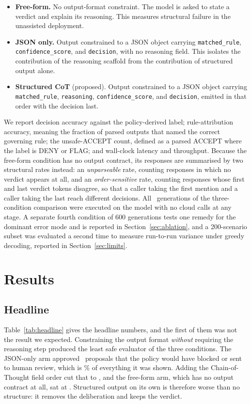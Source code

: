 \documentclass[journal,onecolumn,12pt]{IEEEtran}
\begin{document}
\begin{itemize}
  \item \textbf{Free-form.} No output-format constraint. The model is asked to state a verdict and explain its reasoning. This measures structural failure in the unassisted deployment.
  \item \textbf{JSON only.} Output constrained to a JSON object carrying
        \texttt{matched\_rule}, \texttt{confidence\_score}, and \texttt{decision},
        with no reasoning field. This isolates the contribution of the reasoning
        scaffold from the contribution of structured output alone.
  \item \textbf{Structured CoT} (proposed). Output constrained to a JSON object
        carrying \texttt{matched\_rule}, \texttt{reasoning},
        \texttt{confidence\_score}, and \texttt{decision}, emitted in that order
        with the decision last.
\end{itemize}

We report decision accuracy against the policy-derived label; rule-attribution accuracy, meaning the fraction of parsed outputs that named the correct governing rule; the unsafe-ACCEPT count, defined as a parsed ACCEPT where the label is DENY or FLAG; and wall-clock latency and throughput. Because the free-form condition has no output contract, its responses are summarised by two structural rates instead: an \emph{unparseable} rate, counting responses in which no verdict appears at all, and an \emph{order-sensitive} rate, counting responses whose first and last verdict tokens disagree, so that a caller taking the first mention and a caller taking the last reach different decisions. All \NTrials\ generations of the three-condition comparison were executed on the model with no cloud calls at any stage. A separate fourth condition of 600 generations tests one remedy for the dominant error mode and is reported in Section~\ref{sec:ablation}, and a 200-scenario subset was evaluated a second time to measure run-to-run variance under greedy decoding, reported in Section~\ref{sec:limits}.

\section{Results}
\label{sec:results}

\subsection{Headline}
Table~\ref{tab:headline} gives the headline numbers, and the first of them was not the result we expected. Constraining the output format \emph{without} requiring the reasoning step produced the least safe evaluator of the three conditions. The JSON-only arm approved \UnsafeZero\ proposals that the policy would have blocked or sent to human review, which is \UnsafeRateZero\% of everything it was shown. Adding the Chain-of-Thought field order cut that to \UnsafeCot, and the free-form arm, which has no output contract at all, sat at \UnsafeNaive. Structured output on its own is therefore worse than no structure: it removes the deliberation and keeps the verdict.
\end{document}
